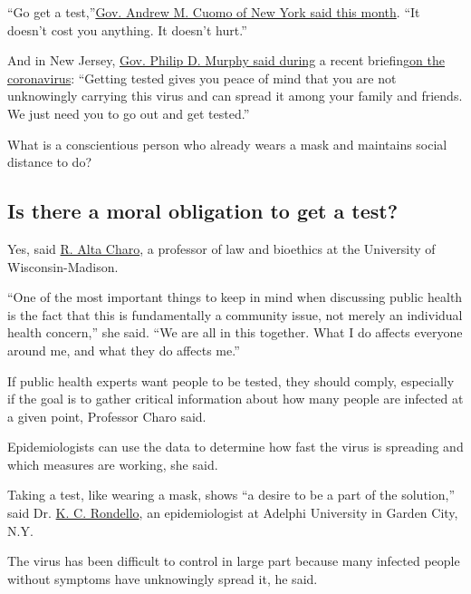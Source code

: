 ``Go get a
test,''\href{https://www.governor.ny.gov/news/video-photos-audio-rush-transcript-governor-cuomo-announces-phase-three-indoor-dining-postponed\#}{Gov.
Andrew M. Cuomo of New York said this month}. ``It doesn't cost you
anything. It doesn't hurt.''

And in New Jersey,
\href{https://nj.gov/governor/news/news/562020/approved/20200623b.shtml}{Gov.
Philip D. Murphy said during} a recent
briefing\href{https://nj.gov/governor/news/news/562020/approved/20200623b.shtml}{on
the coronavirus}: ``Getting tested gives you peace of mind that you are
not unknowingly carrying this virus and can spread it among your family
and friends. We just need you to go out and get tested.''

What is a conscientious person who already wears a mask and maintains
social distance to do?

\hypertarget{is-there-a-moral-obligation-to-get-a-test}{%
\subsection{Is there a moral obligation to get a
test?}\label{is-there-a-moral-obligation-to-get-a-test}}

Yes, said \href{https://law.wisc.edu/profiles/racharo}{R. Alta Charo}, a
professor of law and bioethics at the University of Wisconsin-Madison.

``One of the most important things to keep in mind when discussing
public health is the fact that this is fundamentally a community issue,
not merely an individual health concern,'' she said. ``We are all in
this together. What I do affects everyone around me, and what they do
affects me.''

If public health experts want people to be tested, they should comply,
especially if the goal is to gather critical information about how many
people are infected at a given point, Professor Charo said.

Epidemiologists can use the data to determine how fast the virus is
spreading and which measures are working, she said.

Taking a test, like wearing a mask, shows ``a desire to be a part of the
solution,'' said Dr.
\href{https://www.adelphi.edu/faculty/profiles/profile.php?PID=0328}{K.
C. Rondello}, an epidemiologist at Adelphi University in Garden City,
N.Y.

The virus has been difficult to control in large part because many
infected people without symptoms have unknowingly spread it, he said.

